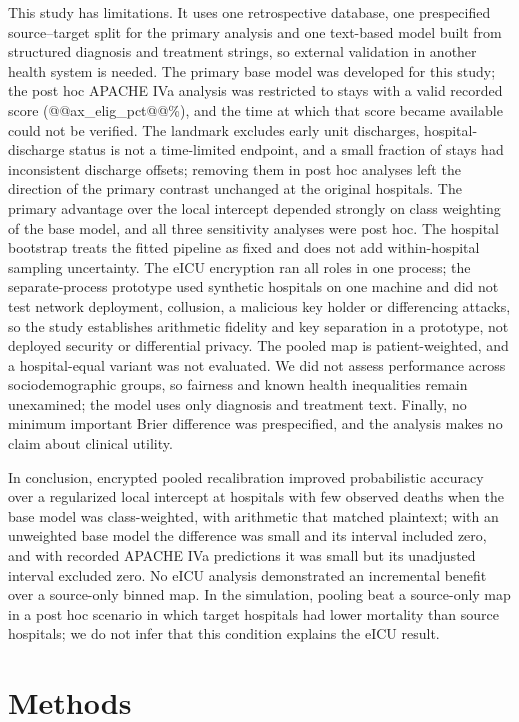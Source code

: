 \documentclass[11pt]{article}
\begin{document}
This study has limitations. It uses one retrospective database, one prespecified source--target split for the primary analysis and one text-based model built from structured diagnosis and treatment strings, so external validation in another health system is needed. The primary base model was developed for this study; the post hoc APACHE IVa analysis was restricted to stays with a valid recorded score (@@ax_elig_pct@@\%), and the time at which that score became available could not be verified. The landmark excludes early unit discharges, hospital-discharge status is not a time-limited endpoint, and a small fraction of stays had inconsistent discharge offsets; removing them in post hoc analyses left the direction of the primary contrast unchanged at the original hospitals. The primary advantage over the local intercept depended strongly on class weighting of the base model, and all three sensitivity analyses were post hoc. The hospital bootstrap treats the fitted pipeline as fixed and does not add within-hospital sampling uncertainty. The eICU encryption ran all roles in one process; the separate-process prototype used synthetic hospitals on one machine and did not test network deployment, collusion, a malicious key holder or differencing attacks, so the study establishes arithmetic fidelity and key separation in a prototype, not deployed security or differential privacy. The pooled map is patient-weighted, and a hospital-equal variant was not evaluated. We did not assess performance across sociodemographic groups, so fairness and known health inequalities remain unexamined; the model uses only diagnosis and treatment text. Finally, no minimum important Brier difference was prespecified, and the analysis makes no claim about clinical utility.

In conclusion, encrypted pooled recalibration improved probabilistic accuracy over a regularized local intercept at hospitals with few observed deaths when the base model was class-weighted, with arithmetic that matched plaintext; with an unweighted base model the difference was small and its interval included zero, and with recorded APACHE IVa predictions it was small but its unadjusted interval excluded zero. No eICU analysis demonstrated an incremental benefit over a source-only binned map. In the simulation, pooling beat a source-only map in a post hoc scenario in which target hospitals had lower mortality than source hospitals; we do not infer that this condition explains the eICU result.

\section*{Methods}
\end{document}
